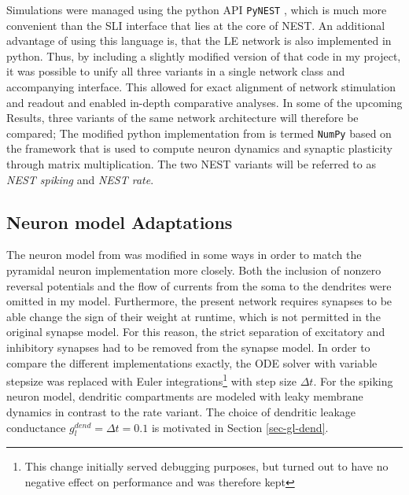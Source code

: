 Simulations were managed using the python API \texttt{PyNEST} \citep{Eppler2009}, which is much more convenient than the
SLI interface that lies at the core of NEST. An additional advantage of using this language is, that the LE network  is
also implemented in python. Thus, by including a slightly modified version of that code in my project, it was possible
to unify all three variants in a single network class and accompanying interface. This allowed for exact alignment of
network stimulation and readout and enabled in-depth comparative analyses. In some of the upcoming Results, three
variants of the same network architecture will therefore be compared; The modified python implementation from
\citep{Haider2021} is termed \texttt{NumPy} based on the framework that is used to compute neuron dynamics and synaptic
plasticity through matrix multiplication. The two NEST variants will be referred to as \textit{NEST spiking} and
\textit{NEST rate}. 

\subsection{Neuron model Adaptations}

The neuron model from \cite{Stapmanns2021} was modified in some ways in order to match the pyramidal neuron
implementation more closely. Both the inclusion of nonzero reversal potentials and the flow of currents from the soma to
the dendrites were omitted in my model. Furthermore, the present network requires synapses to be able
change the sign of their weight at runtime, which is not permitted in the original synapse model. For this reason, the
strict separation of excitatory and inhibitory synapses had to be removed from the synapse model. In order to compare
the different implementations exactly, the ODE solver with variable stepsize was replaced with Euler
integrations\footnote{This change initially served debugging purposes, but turned out to have no negative effect on
performance and was therefore kept} with step size $\Delta t$. For the spiking neuron model, dendritic compartments are
modeled with leaky membrane dynamics in contrast to the rate variant. The choice of dendritic leakage conductance
$g_l^{dend}=\Delta t=0.1$ is motivated in Section \ref{sec-gl-dend}.

